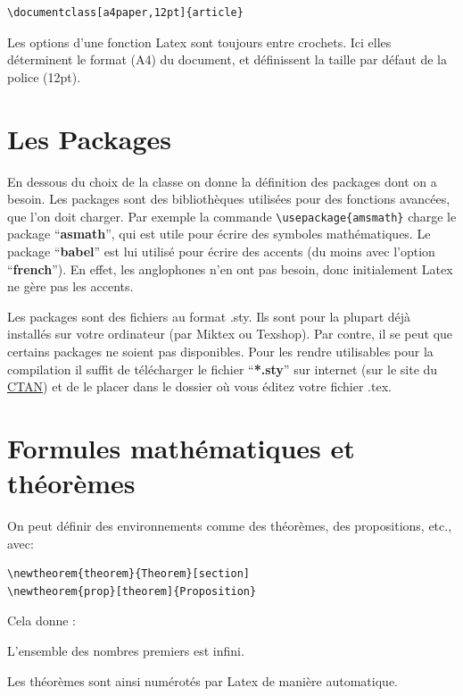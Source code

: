 \begin{lstlisting}
\documentclass[a4paper,12pt]{article}
\end{lstlisting}

Les options d'une fonction Latex sont toujours entre crochets. Ici elles déterminent le format 
(A4) du document, et définissent la taille par d\'efaut de la police (12pt).

\section{Les Packages}

En dessous du choix de la classe on donne la définition des packages dont on a besoin. 
Les packages sont des bibliothèques utilisées pour des fonctions avancées, que l'on doit charger.
 Par exemple la commande  \lstinline+\usepackage{amsmath}+ charge le package ``\textbf{asmath}'',
 qui est utile  pour écrire des symboles mathématiques. Le package ``\textbf{babel}''  est lui 
utilisé pour écrire des accents (du moins avec l'option ``\textbf{french}''). En effet, les anglophones
 n'en ont pas besoin, donc initialement Latex ne gère pas les accents. 

Les packages sont des fichiers au format .sty. Ils sont pour la plupart déjà installés sur votre 
ordinateur (par Miktex ou Texshop). Par contre, il se peut que certains packages ne soient pas 
disponibles.  Pour les rendre utilisables pour la compilation il suffit de télécharger le fichier 
``\textbf{*.sty}''  sur internet (\eg sur le site du  \href{http://www.ctan.org/}{CTAN})
  et de le placer dans le dossier où vous éditez votre fichier .tex.

\section{Formules mathématiques et théorèmes}
On peut définir des environnements comme des théorèmes, des propositions, etc., avec:\medskip
\begin{lstlisting}
\newtheorem{theorem}{Theorem}[section] 
\newtheorem{prop}[theorem]{Proposition}
\end{lstlisting}
Cela donne :

\begin{theorem}
 L'ensemble des nombres premiers est infini.
\end{theorem}
Les théorèmes  sont ainsi numérotés par Latex de manière automatique.

